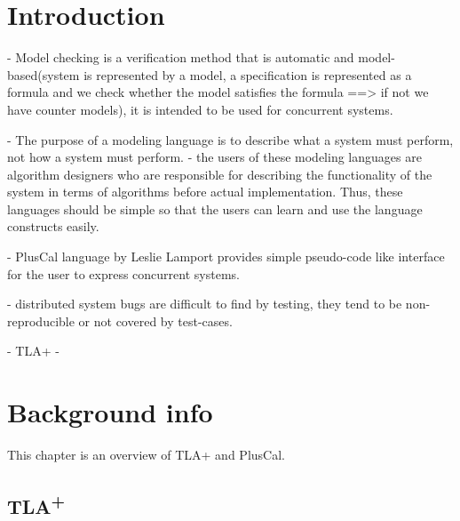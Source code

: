 \documentclass{thesul}
\newcommand{\tlaplus}{TLA\textsuperscript{+}\xspace}
\begin{document}
\WritePartLabelInToc
\WriteChapterLabelInToc


\tableofcontents

\NoChapterHead


\mainmatter


\chapter{Introduction}

- Model checking is a verification method that is automatic and model-based(system is represented by a model, a specification is represented as a formula and we check whether the model satisfies the formula ==> if not we have counter models), it is intended to be used for concurrent systems.

- The purpose of a modeling language is to describe what a system must perform,
not how a system must perform.
- the users of these modeling languages are algorithm designers who
are responsible for describing the functionality of the system in terms of algorithms
before actual implementation. Thus, these languages should be simple so that the
users can learn and use the language constructs easily.

- PlusCal language by Leslie Lamport provides simple pseudo-code like interface
for the user to express concurrent systems.

- distributed system bugs are difficult to find by testing, they tend to be non-reproducible or not covered by test-cases.

- TLA+
- 

\chapter{Background info}

This chapter is an overview of TLA+ and PlusCal.
\section{\tlaplus}
\end{document}
